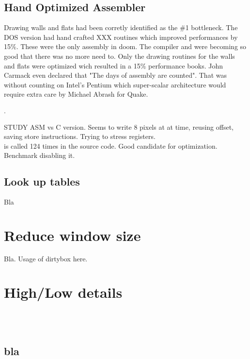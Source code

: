 \subsection{Hand Optimized Assembler}
Drawing walls and flats had been corretly identified as the \#1 bottleneck. The DOS version had hand crafted XXX routines which improved performances by 15\%. These were the only assembly in doom. The compiler and  were becoming so good that there was no more need to. Only the drawing routines for the walls and flats were optimized wich resulted in a 15\% performance books. John Carmack even declared that "The days of assembly are counted". That was without counting on Intel's Pentium which super-scalar architecture would require extra care by Michael Abrash for Quake.\\
\par
 .
 \par
 STUDY ASM vs C version. Seems to write 8 pixels at at time, reusing offset, saving store instructions. Trying to stress registers.\\
  is called 124 times in the source code. Good candidate for optimization. Benchmark disabling it.
 \par

\subsection{Look up tables}
Bla
\section{Reduce window size}
Bla. Usage of dirtybox here.
\section{High/Low details}

\\
\\


\subsection{bla}
\par

